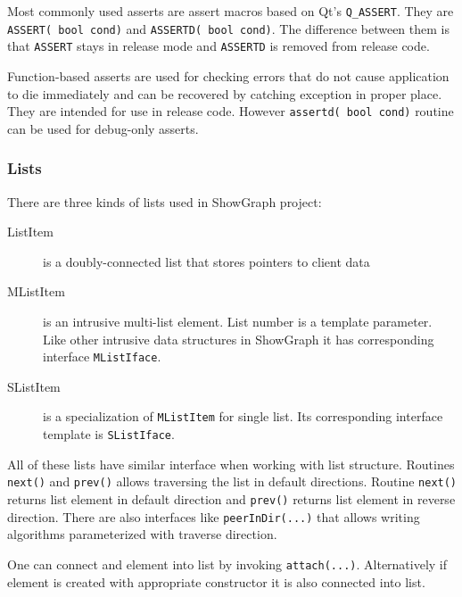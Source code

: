 \documentclass[11pt,twoside,a4paper]{article}
\begin{document}
Most commonly used asserts are assert macros based on Qt's \lstinline{Q_ASSERT}. They are \lstinline{ASSERT( bool cond)} and \lstinline{ASSERTD( bool cond)}. The difference between them is that \lstinline{ASSERT} stays in release mode and \lstinline{ASSERTD} is removed from release code. 

Function-based asserts are used for checking errors that do not cause application to die immediately and can be recovered by catching exception in proper place. They are intended for use in release code. However \lstinline{assertd( bool cond)} routine can be used for debug-only asserts.

\subsubsection{Lists}
There are three kinds of lists used in ShowGraph project:
\begin{description}
\item[ListItem] is a doubly-connected list that stores pointers to client data
\item[MListItem] is an intrusive multi-list element. List number is a template parameter. Like other intrusive data structures in ShowGraph it has corresponding interface \lstinline{MListIface}.
\item[SListItem] is a specialization of \lstinline{MListItem} for single list. Its corresponding interface template is \lstinline{SListIface}.
\end{description}

All of these lists have similar interface when working with list structure. Routines \lstinline{next()} and \lstinline{prev()} allows traversing the list in default directions. Routine \lstinline{next()} returns list element in default direction and \lstinline{prev()} returns list element in reverse direction. There are also interfaces like \lstinline{peerInDir(...)} that allows writing algorithms parameterized with traverse direction. 

One can connect and element into list by invoking \lstinline{attach(...)}. Alternatively if element is created with appropriate constructor it is also connected into list.
\end{document}
